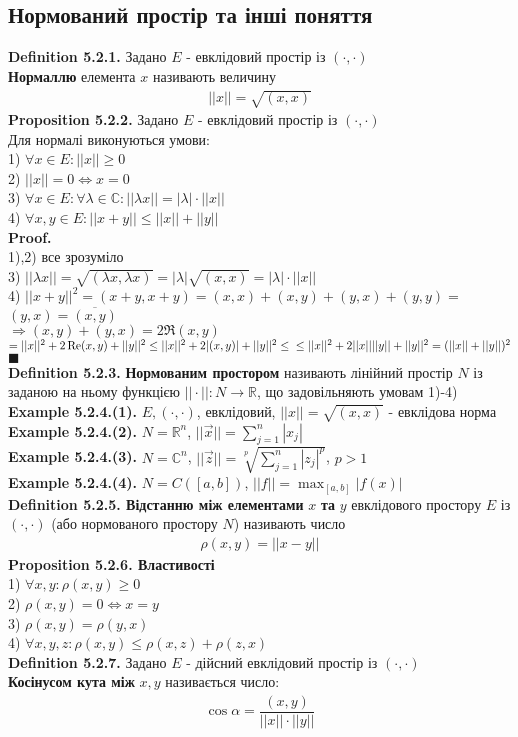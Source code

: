\documentclass[a4paper, 14pt]{extarticle}
\def\huge{\displaystyle}
\def\defin#1{\textbf{Definition {#1}}}
\def\ex#1{\textbf{Example {#1}}}
\def\prp#1{\textbf{Proposition {#1}}}
\def\proof{\textbf{Proof.}\\}
\def\bigline{\vspace{5mm}\\}
\def\qed{$\blacksquare$}
\begin{document}
\subsection{Нормований простір та інші поняття}
\defin{5.2.1.} Задано $E$ - евклідовий простір із $(\cdot, \cdot)$\\
\textbf{Нормаллю} елемента $x$ називають величину
\begin{align*}
||x|| = \sqrt{(x,x)}
\end{align*}
\prp{5.2.2.} Задано $E$ - евклідовий простір із $(\cdot, \cdot)$\\
Для нормалі виконуються умови:\\
1) $\forall x \in E: ||x|| \geq 0$\\
2) $||x|| = 0 \iff x = 0$\\
3) $\forall x \in E: \forall \lambda \in \mathbb{C}: ||\lambda x|| = |\lambda| \cdot ||x||$\\
4) $\forall x,y \in E: ||x+y|| \leq ||x||+ ||y||$\\
\proof
1),2) все зрозуміло
\bigline
3) $||\lambda x|| = \sqrt{(\lambda x, \lambda x)} = |\lambda| \sqrt{(x,x)} = |\lambda| \cdot ||x||$
\bigline
4) $||x+y||^2 = (x+y,x+y) = (x,x)+(x,y)+(y,x)+(y,y) =$\\
$(y,x) = \overline{(x,y)}$\\
$\Rightarrow (x,y) + (y,x) = 2 \Re (x,y)$\\
$= ||x||^2 + 2 \Re (x,y) + ||y||^2 \leq ||x||^2 + 2|(x,y)|+||y||^2 \leq \\ \leq ||x||^2 + 2||x||||y|| + ||y||^2 = (||x||+||y||)^2$ \qed
\bigline
\defin{5.2.3.} \textbf{Нормованим простором} називають лінійний простір $N$ із заданою на ньому функцією $|| \cdot ||: N \to \mathbb{R}$, що задовільняють умовам 1)-4)
\bigline
\ex{5.2.4.(1).} $E, (\cdot,\cdot)$, евклідовий, $||x|| = \sqrt{(x,x)}$ - евклідова норма\\
\ex{5.2.4.(2).} $N = \mathbb{R}^n$, $||\vec{x}|| = \huge \sum_{j=1}^n |x_j|$\\
\ex{5.2.4.(3).} $N = \mathbb{C}^n$, $||\vec{z}|| = \huge \sqrt[p]{\sum_{j=1}^n |z_j|^p}$, $p>1$\\
\ex{5.2.4.(4).} $N = C([a,b])$, $||f|| = \huge \max_{[a,b]} |f(x)|$
\bigline
\defin{5.2.5. Відстанню між елементами} $x$ \textbf{та} $y$ евклідового простору $E$ із $(\cdot,\cdot)$ (або нормованого простору $N$) називають число
\begin{align*}
\rho(x,y) = ||x-y||
\end{align*}
\prp{5.2.6. Властивості}\\
1) $\forall x,y: \rho(x,y) \geq 0$\\
2) $\rho(x,y) = 0 \iff x = y$\\
3) $\rho(x,y) = \rho(y,x)$\\
4) $\forall x,y,z: \rho(x,y) \leq \rho(x,z) + \rho(z,x)$
\bigline
\defin{5.2.7.} Задано $E$ - дійсний евклідовий простір із $(\cdot,\cdot)$\\
\textbf{Косінусом кута між} $x,y$ називається число:
\begin{align*}
\cos \alpha = \dfrac{(x,y)}{||x|| \cdot ||y||}
\end{align*}
\\
\end{document}
